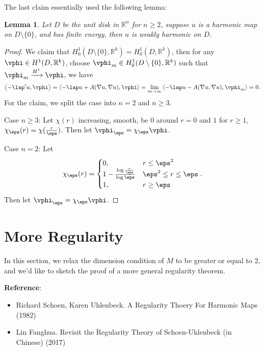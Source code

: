 \documentclass[UTF8,12pt]{article}
\theoremstyle{plain}\newtheorem{theorem}{Theorem}
\theoremstyle{definition}\newtheorem{definition}[theorem]{Definition}
\theoremstyle{definition}\newtheorem{example}[theorem]{Example}
\theoremstyle{plain}\newtheorem{axiom}[theorem]{Axiom}
\theoremstyle{plain}\newtheorem{assertion}[theorem]{Assertion}
\theoremstyle{plain}\newtheorem{corollary}[theorem]{Corollary}
\theoremstyle{plain}\newtheorem{lemma}[theorem]{Lemma}
\theoremstyle{plain}\newtheorem{proposition}[theorem]{Proposition}
\theoremstyle{plain}\newtheorem{prop}[theorem]{Proposition}
\theoremstyle{plain}\newtheorem{conjecture}[theorem]{Conjecture}
\theoremstyle{plain}\newtheorem{conj}[theorem]{Conjecture}
\theoremstyle{plain}\newtheorem{problem}[theorem]{Problem}
\theoremstyle{remark}\newtheorem{notation}[theorem]{Notation}
\theoremstyle{definition}\newtheorem*{question}{Question}
\theoremstyle{definition}\newtheorem*{answer}{Answer}
\theoremstyle{definition}\newtheorem*{goal}{Goal}
\theoremstyle{plain}\newtheorem*{application}{Application}
\theoremstyle{plain}\newtheorem*{exercise}{Exercise}
\theoremstyle{remark}\newtheorem*{remark}{Remark}
\theoremstyle{remark}\newtheorem*{note}{\small{Note}}
\numberwithin{equation}{section}
\numberwithin{theorem}{section}
\numberwithin{figure}{section}
\begin{document}
The last claim essentially used the following lemma:
\begin{lemma}
    Let \(D\) be the unit disk in \(\mathbb{R}^n\) for \(n\ge 2\), suppose \(u\)
    is a harmonic map on \(D\setminus\{0\}\), and has finite energy, then \(u\) is
    weakly harmonic on \(D\).
\end{lemma}
\begin{proof}
    We claim that \(H_0^1(D\setminus\{0\},\mathbb{R}^k)=H_0^1(D,\mathbb{R}^k)\), then
    for any \(\vphi\in H^1(D,\mathbb{R}^k)\), choose \(\vphi_m\in H_0^1(D\setminus
    \{0\},\mathbb{R}^k)\) such that \(\vphi_m\xrightarrow{H^1}\vphi\), we have \[
        \left<-\lap' u,\vphi\right> =\left<-\lap u+A(\nabla u,\nabla u),
        \vphi\right> =\lim_{m\to\infty}\left<-\lap u-A(\nabla u, \nabla u),
        \vphi_m\right> =0
    .\] For the claim, we split the case into \(n=2\) and \(n\ge 3\).

    Case \(n\ge 3\): Let \(\chi(r)\) increasing, smooth, be 0 around \(r=0\) and
    \(1\) for \(r\ge 1\), \(\chi_\eps(r)=\chi(\frac{r}{\eps})\). Then let
    \(\vphi_\eps=\chi_\eps\vphi\).

    Case \(n=2\): Let \[
        \chi_\eps(r)=\begin{cases}
            0, & r\le \eps^2 \\
            1-\frac{\log \frac{r}{\eps}}{\log\eps} & \eps^2\le r\le \eps \\
            1, & r\ge \eps
        \end{cases}
    .\] Then let \(\vphi_\eps=\chi_\eps\vphi\).
\end{proof}

\section{More Regularity}
In this section, we relax the dimension condition of \(M\) to be greater or equal to 2,
and we'd like to sketch the proof of a more general regularity theorem.

\noindent\textbf{Reference}:
\begin{itemize}\itshape{}
\item Richard Schoen, Karen Uhlenbeck. A Regularity Thoery For Harmonic Maps (1982)
\item Lin Fanghua. Revisit the Regularity Theory of Schoen-Uhlenbeck (in Chinese) (2017)
\end{itemize}
\end{document}
